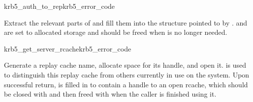 \begin{funcdecl}{krb5_auth_to_rep}{krb5_error_code}{\funcin}
\funcout
{}
\end{funcdecl}
Extract the relevant parts of  and fill them into the
structure pointed to by .  
and  are set to allocated storage and
should be freed when  is no longer needed.

\begin{funcdecl}{krb5_get_server_rcache}{krb5_error_code}{\funcin}
\funcout
{}
\end{funcdecl}
Generate a replay cache name, allocate space for its handle, and open
it.   is used to distinguish this replay cache from
others currently in use on the system.
Upon successful return,  is filled in to contain a
handle to an open rcache, which should be closed with
 and then freed with  when the
caller is finished using it.
